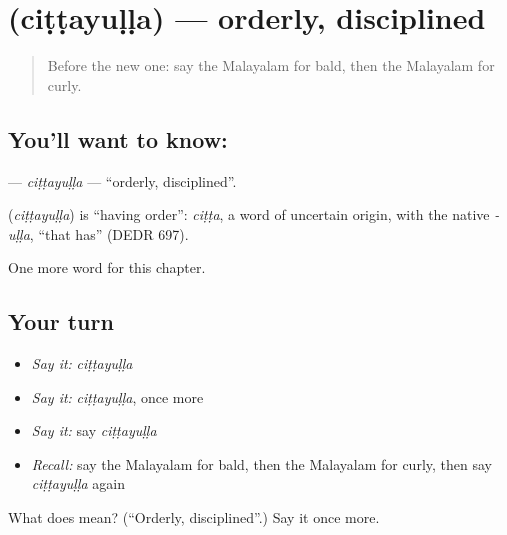 \section[\texorpdfstring{\ml{ചിട്ടയുള്ള} (ciṭṭayuḷḷa)}{ചിട്ടയുള്ള (ciṭṭayuḷḷa)}]{ (ciṭṭayuḷḷa) — orderly, disciplined}

\label{lesson:ML-C247-cittayulla}



\begin{quote}
Before the new one: say the Malayalam for bald, then the Malayalam for curly.
\end{quote}

\subsection*{You'll want to know: }
\textbf{} — \emph{ciṭṭayuḷḷa} — \textquotedblleft{}orderly, disciplined\textquotedblright{}.

\begin{cousinweb}
\textbf{} (\emph{ciṭṭayuḷḷa}) is \textquotedblleft{}having order\textquotedblright{}: \emph{ciṭṭa}, a word of uncertain origin, with the native \emph{-uḷḷa}, \textquotedblleft{}that has\textquotedblright{} (DEDR 697).
\end{cousinweb}

\begin{grammarlens}[title={What you've built}]
One more word for this chapter.
\end{grammarlens}

\subsection*{Your turn}
\begin{itemize}
\raggedright
  \item \emph{Say it:} \emph{ciṭṭayuḷḷa}
  \item \emph{Say it:} \emph{ciṭṭayuḷḷa}, once more
  \item \emph{Say it:} say \emph{ciṭṭayuḷḷa}
  \item \emph{Recall:} say the Malayalam for bald, then the Malayalam for curly, then say \emph{ciṭṭayuḷḷa} again
\end{itemize}

\begin{tcolorbox}[breakable,colback=teal!4,colframe=teal!35!black,title={Before you move on}]
What does  mean? (\textquotedblleft{}Orderly, disciplined\textquotedblright{}.) Say it once more.
\end{tcolorbox}
